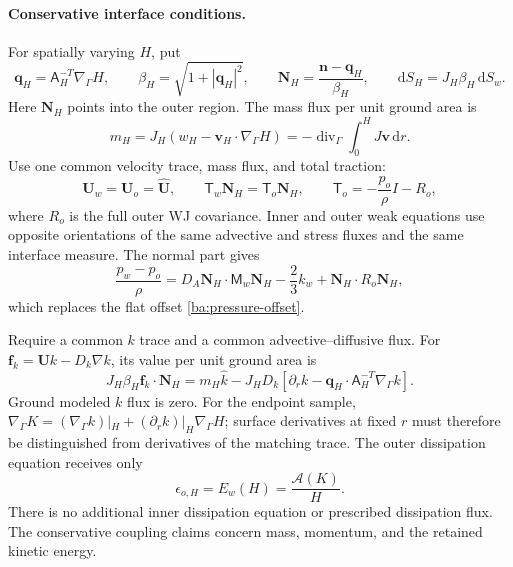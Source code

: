 \documentclass[11pt,a4paper]{article}
\numberwithin{equation}{section}
\begin{document}
\paragraph{Conservative interface conditions.}
For spatially varying $H$, put
\begin{equation}
 \boldsymbol q_H=\mathsf A_H^{-T}\nabla_\Gamma H,\qquad
 \beta_H=\sqrt{1+|\boldsymbol q_H|^2},\qquad
 \boldsymbol N_H=\frac{\boldsymbol n-\boldsymbol q_H}{\beta_H},\qquad
 \mathrm dS_H=J_H\beta_H\,\mathrm dS_w.
 \label{ba:interface-geometry}
\end{equation}
Here $\boldsymbol N_H$ points into the outer region. The mass flux per
unit ground area is
\begin{equation}
 m_H=J_H(w_H-\boldsymbol v_H\cdot\nabla_\Gamma H)
 =-\operatorname{div}_\Gamma\int_0^HJ\boldsymbol v\,\mathrm dr.
 \label{ba:interface-mass}
\end{equation}
Use one common velocity trace, mass flux, and total traction:
\begin{equation}
 \boldsymbol U_w=\boldsymbol U_o=\widehat{\boldsymbol U},\qquad
 \mathsf T_w\boldsymbol N_H=\mathsf T_o\boldsymbol N_H,
 \qquad \mathsf T_o=-\frac{p_o}{\rho}I-R_o,
 \label{ba:interface-momentum}
\end{equation}
where $R_o$ is the full outer WJ covariance. Inner and outer weak
equations use opposite orientations of the same advective and stress
fluxes and the same interface measure. The normal part gives
\begin{equation}
 \frac{p_w-p_o}{\rho}
 =D_A\boldsymbol N_H\cdot\mathsf M_w\boldsymbol N_H
   -\frac23k_w+\boldsymbol N_H\cdot R_o\boldsymbol N_H,
 \label{ba:curved-pressure}
\end{equation}
which replaces the flat offset \eqref{ba:pressure-offset}.

Require a common $k$ trace and a common advective--diffusive flux. For
$\boldsymbol f_k=\boldsymbol U k-D_k\nabla k$, its value per unit
ground area is
\begin{equation}
 J_H\beta_H\boldsymbol f_k\cdot\boldsymbol N_H
 =m_H\widehat k-J_HD_k
  \left[\partial_rk-
        \boldsymbol q_H\cdot\mathsf A_H^{-T}\nabla_\Gamma k\right].
 \label{ba:interface-k}
\end{equation}
Ground modeled $k$ flux is zero. For the endpoint sample,
$\nabla_\Gamma K=(\nabla_\Gamma k)|_H+
(\partial_rk)|_H\nabla_\Gamma H$; surface derivatives at fixed $r$ must
therefore be distinguished from derivatives of the matching trace.
The outer dissipation equation receives only
\begin{equation}
 \boxed{\epsilon_{o,H}=E_w(H)=\frac{\mathcal A(K)}{H}.}
 \label{ba:epsilon-trace}
\end{equation}
There is no additional inner dissipation equation or prescribed
dissipation flux. The conservative coupling claims concern mass,
momentum, and the retained kinetic energy.
\end{document}
